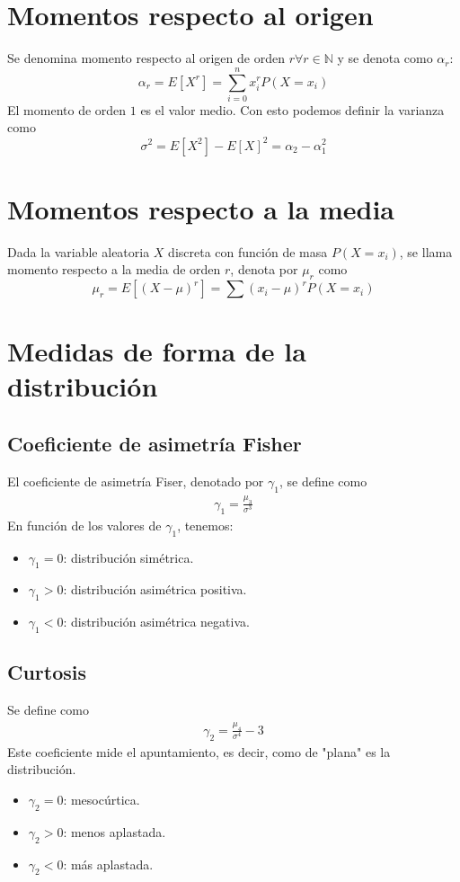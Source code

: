 \documentclass{./Probabilidad.tex}
\begin{document}
\section{Momentos respecto al origen}
Se denomina momento respecto al origen de orden $r \forall r \in \mathbb{N}$ y se denota como $\alpha_{r}$:
$$
\alpha_{r}=E[X^{r}] = \sum_{i=0}^{n} x_{i}^{r}P(X=x_{i})
$$
El momento de orden $1$ es el valor medio. Con esto podemos definir la varianza como
$$
\sigma^{2}=E[X^{2}]-E[X]^{2}=\alpha_{2}-\alpha_{1}^{2}
$$
\section{Momentos respecto a la media}
Dada la variable aleatoria $X$ discreta con función de masa $P(X=x_{i})$, se llama momento respecto a la media de orden $r$, denota por $\mu_{r}$ como
\[
	\mu_{r}=E[(X-\mu)^{r}]= \sum (x_{i}-\mu)^{r}P(X=x_{i})
\]
\section{Medidas de forma de la distribución}
\subsection{Coeficiente de asimetría Fisher}
El coeficiente de asimetría Fiser, denotado por $\gamma_1$, se define como
\begin{equation}
	\begin{split}
		\gamma_1= \frac{\mu_{3}}{\sigma^{3}}
	\end{split}
\end{equation}
En función de los valores de $\gamma_1$, tenemos:
\begin{itemize}
	\item $\gamma_1 = 0$: distribución simétrica.
	\item $\gamma_1> 0$: distribución asimétrica positiva.
	\item $\gamma_1<0$: distribución asimétrica negativa. 
\end{itemize}
\subsection{Curtosis}
Se define como
\begin{equation}
	\begin{split}
		\gamma_2= \frac{\mu_{4}}{\sigma^{4}}-3
	\end{split}
\end{equation}
Este coeficiente mide el apuntamiento, es decir, como de "plana" es la distribución.
\begin{itemize}
	\item $\gamma_2 = 0$: mesocúrtica.
	\item $\gamma_2 > 0$: menos aplastada.
	\item $\gamma_2 < 0$: más aplastada. 
\end{itemize}
\end{document}
